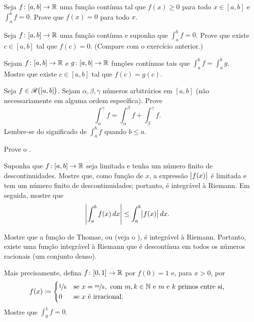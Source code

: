 \begin{exercise}
Seja $f \colon [a,b] \to {\mathbb{R}}$ uma função contínua tal que $f(x) \geq 0$
para todo $x \in [a,b]$ e $\int_a^b f = 0$. Prove que $f(x) = 0$
para todo $x$.
\end{exercise}

\begin{exercise}
Seja $f \colon [a,b] \to {\mathbb{R}}$ uma função contínua
e suponha que $\int_a^b f = 0$. Prove que existe
$c \in [a,b]$ tal que $f(c) = 0$. (Compare com o exercício anterior.)
\end{exercise}

\begin{exercise}
Sejam $f \colon [a,b] \to {\mathbb{R}}$ e $g \colon [a,b] \to {\mathbb{R}}$
funções contínuas tais que $\int_a^b f = \int_a^b g$.
Mostre que existe $c \in [a,b]$ tal que $f(c) = g(c)$.
\end{exercise}

\begin{exercise}
Seja $f \in {\mathscr{R}}\bigl([a,b]\bigr)$. Sejam $\alpha, \beta, \gamma$ números
arbitrários em $[a,b]$ (não necessariamente em alguma ordem específica). Prove
\begin{equation*}
\int_\alpha^\gamma f =
\int_\alpha^\beta f +
\int_\beta^\gamma f .
\end{equation*}
Lembre-se do significado de $\int_a^b f$ quando $b \leq a$.
\end{exercise}

\begin{exercise}
Prove o .
\end{exercise}

\begin{exercise} \label{exercise:easyabsint}
Suponha que $f \colon [a,b] \to {\mathbb{R}}$ seja limitada e
tenha um número finito de descontinuidades.
Mostre que, como função de $x$, a expressão $\bigl\lvert {f(x)} \bigr\rvert$ é limitada e tem um número finito de
descontinuidades; portanto, é integrável à Riemann. Em seguida, mostre que
\begin{equation*}
\left\lvert {\int_a^b f(x)\,dx} \right\rvert \leq \int_a^b \bigl\lvert {f(x)} \bigr\rvert\,dx .
\end{equation*}
\end{exercise}

\begin{exercise}[Difícil]
Mostre que a função de
Thomae, ou 
(veja o ),
é integrável à Riemann. Portanto, existe uma função integrável à Riemann
que é descontínua em todos os números racionais (um conjunto denso).

Mais precisamente, defina $f \colon [0,1] \to {\mathbb{R}}$ por $f(0)=1$ e, para $x > 0$, por
\begin{equation*}
f(x) \coloneqq 
\begin{cases}
\nicefrac{1}{k} & \text{se } x=\nicefrac{m}{k}, \text{ com }
m,k \in {\mathbb{N}} \text{ e } m \text{ e } k \text{ primos entre si,} \\
0               & \text{se } x \text{ é irracional.}
\end{cases}
\end{equation*}
Mostre que $\int_0^1 f = 0$.
\end{exercise}


